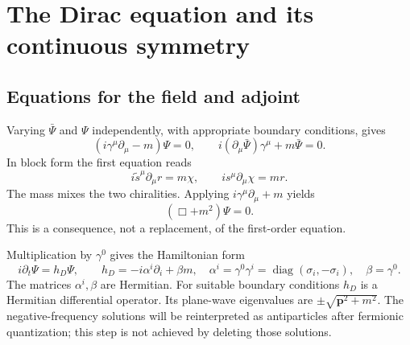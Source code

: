 \documentclass[11pt]{article}
\newcommand{\diag}{\operatorname{diag}}
\begin{document}
\section{The Dirac equation and its continuous symmetry}
\subsection{Equations for the field and adjoint}
Varying \(\bar\Psi\) and \(\Psi\) independently, with appropriate
boundary conditions, gives
\begin{equation}
 (i\gamma^\mu\partial_\mu-m)\Psi=0,\qquad
 i(\partial_\mu\bar\Psi)\gamma^\mu+m\bar\Psi=0.
 \label{eq:diraceom}
\end{equation}
In block form the first equation reads
\begin{equation}
 i\widetilde s^\mu\partial_\mu r=m\chi,\qquad
 i s^\mu\partial_\mu\chi=mr.
 \label{eq:diracblocks}
\end{equation}
The mass mixes the two chiralities. Applying
\(i\gamma^\mu\partial_\mu+m\) yields
\begin{equation}
 (\Box+m^2)\Psi=0.
 \label{eq:dirackg}
\end{equation}
This is a consequence, not a replacement, of the first-order equation.

Multiplication by \(\gamma^0\) gives the Hamiltonian form
\begin{equation}
 i\partial_t\Psi=h_D\Psi,\qquad
 h_D=-i\alpha^i\partial_i+\beta m,\quad
 \alpha^i=\gamma^0\gamma^i=\diag(\sigma_i,-\sigma_i),\quad
 \beta=\gamma^0.
 \label{eq:hamdirac}
\end{equation}
The matrices \(\alpha^i,\beta\) are Hermitian. For suitable boundary
conditions \(h_D\) is a Hermitian differential operator. Its plane-wave
eigenvalues are \(\pm\sqrt{\bm p^2+m^2}\). The negative-frequency
solutions will be reinterpreted as antiparticles after fermionic
quantization; this step is not achieved by deleting those solutions.
\end{document}
